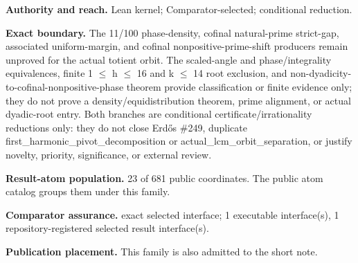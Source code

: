 \textbf{Authority and reach.} Lean kernel; Comparator-selected; conditional reduction.

\textbf{Exact boundary.} The 11/100 phase-density, cofinal natural-prime strict-gap, associated uniform-margin, and cofinal nonpositive-prime-shift producers remain unproved for the actual totient orbit. The scaled-angle and phase/integrality equivalences, finite 1 \ensuremath{\le} h \ensuremath{\le} 16 and k \ensuremath{\le} 14 root exclusion, and non-dyadicity-to-cofinal-nonpositive-phase theorem provide classification or finite evidence only; they do not prove a density/equidistribution theorem, prime alignment, or actual dyadic-root entry. Both branches are conditional certificate/irrationality reductions only: they do not close Erdős \#249, duplicate first\_harmonic\_pivot\_decomposition or actual\_lcm\_orbit\_separation, or justify novelty, priority, significance, or external review.

\textbf{Result-atom population.} 23 of 681 public coordinates. The public atom catalog groups them under this family.

\textbf{Comparator assurance.} exact selected interface; 1 executable interface(s), 1 repository-registered selected result interface(s).

\textbf{Publication placement.} This family is also admitted to the short note.

